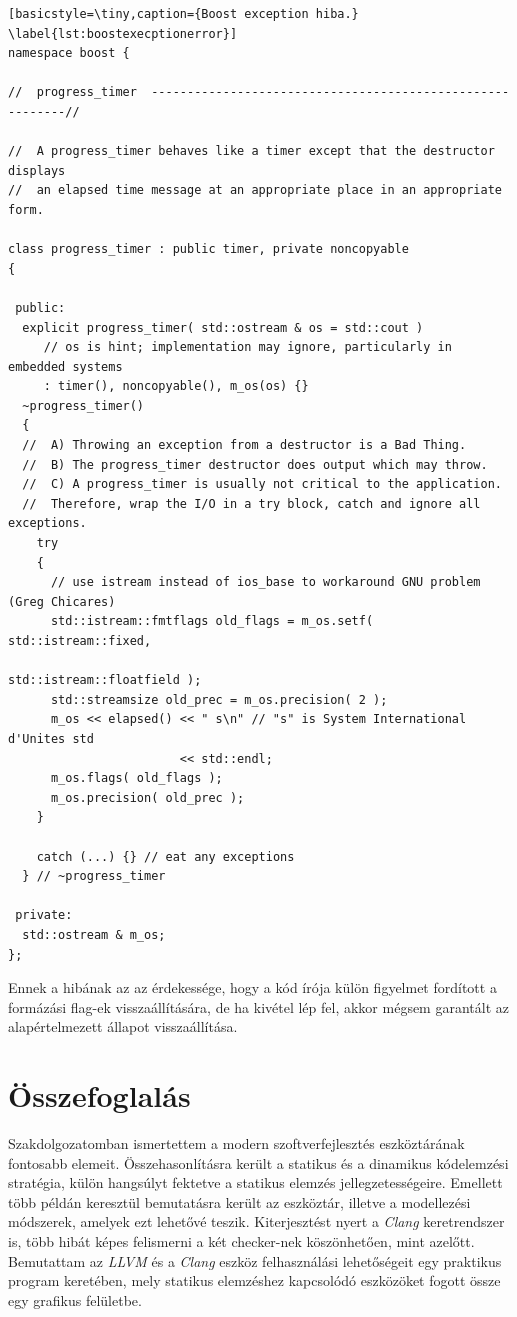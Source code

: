 \documentclass[a4paper,12pt]{report}
\begin{document}
\begin{minipage}{\linewidth}
\begin{lstlisting}[basicstyle=\tiny,caption={Boost exception hiba.}
\label{lst:boostexecptionerror}]
namespace boost {

//  progress_timer  ----------------------------------------------------------//

//  A progress_timer behaves like a timer except that the destructor displays
//  an elapsed time message at an appropriate place in an appropriate form.

class progress_timer : public timer, private noncopyable
{

 public:
  explicit progress_timer( std::ostream & os = std::cout )
     // os is hint; implementation may ignore, particularly in embedded systems
     : timer(), noncopyable(), m_os(os) {}
  ~progress_timer()
  {
  //  A) Throwing an exception from a destructor is a Bad Thing.
  //  B) The progress_timer destructor does output which may throw.
  //  C) A progress_timer is usually not critical to the application.
  //  Therefore, wrap the I/O in a try block, catch and ignore all exceptions.
    try
    {
      // use istream instead of ios_base to workaround GNU problem (Greg Chicares)
      std::istream::fmtflags old_flags = m_os.setf( std::istream::fixed,
                                                   std::istream::floatfield );
      std::streamsize old_prec = m_os.precision( 2 );
      m_os << elapsed() << " s\n" // "s" is System International d'Unites std
                        << std::endl;
      m_os.flags( old_flags );
      m_os.precision( old_prec );
    }

    catch (...) {} // eat any exceptions
  } // ~progress_timer

 private:
  std::ostream & m_os;
}; 
\end{lstlisting}
\end{minipage}

Ennek a hibának az az érdekessége, hogy a kód írója külön figyelmet fordított a formázási flag-ek visszaállítására, de ha kivétel lép fel, akkor mégsem garantált az alapértelmezett állapot visszaállítása.

\chapter{Összefoglalás}
Szakdolgozatomban ismertettem a modern szoftverfejlesztés eszköztárának fontosabb elemeit. Összehasonlításra került a statikus és a dinamikus kódelemzési stratégia, külön hangsúlyt fektetve a statikus elemzés jellegzetességeire. Emellett több példán keresztül bemutatásra került az eszköztár, illetve a modellezési módszerek, amelyek ezt lehetővé teszik. Kiterjesztést nyert a \emph{Clang} keretrendszer is, több hibát képes felismerni a két checker-nek köszönhetően, mint azelőtt. Bemutattam az \emph{LLVM} és a \emph{Clang} eszköz felhasználási lehetőségeit egy praktikus program keretében, mely statikus elemzéshez kapcsolódó eszközöket fogott össze egy grafikus felületbe.
\end{document}
